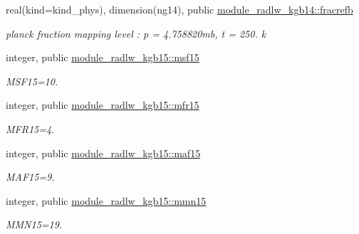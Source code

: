 \begin{DoxyCompactItemize}
real(kind=kind\+\_\+phys), dimension(ng14), public \hyperlink{group__module__radlw__kgbnn_ga13a211bf8a903d0720fa72ac90e4fc3f}{module\+\_\+radlw\+\_\+kgb14\+::fracrefb}
\begin{DoxyCompactList}\small\item\em planck fraction mapping level \+: p = 4.\+758820mb, t = 250. k \end{DoxyCompactList}\item 
\mbox{\label{group__module__radlw__kgbnn_gae1b588ee60974c2d451c89f842601e07}} 
integer, public \hyperlink{group__module__radlw__kgbnn_gae1b588ee60974c2d451c89f842601e07}{module\+\_\+radlw\+\_\+kgb15\+::msf15}
\begin{DoxyCompactList}\small\item\em M\+S\+F15=10. \end{DoxyCompactList}\item 
\mbox{\label{group__module__radlw__kgbnn_gad4d78009d0c7ffa27dbb228e68307675}} 
integer, public \hyperlink{group__module__radlw__kgbnn_gad4d78009d0c7ffa27dbb228e68307675}{module\+\_\+radlw\+\_\+kgb15\+::mfr15}
\begin{DoxyCompactList}\small\item\em M\+F\+R15=4. \end{DoxyCompactList}\item 
\mbox{\label{group__module__radlw__kgbnn_ga482858cf08fb1a14117dfbaa6a57fe8c}} 
integer, public \hyperlink{group__module__radlw__kgbnn_ga482858cf08fb1a14117dfbaa6a57fe8c}{module\+\_\+radlw\+\_\+kgb15\+::maf15}
\begin{DoxyCompactList}\small\item\em M\+A\+F15=9. \end{DoxyCompactList}\item 
\mbox{\label{group__module__radlw__kgbnn_ga8ab45999cfc7b9db0f3d3b61ccf803e8}} 
integer, public \hyperlink{group__module__radlw__kgbnn_ga8ab45999cfc7b9db0f3d3b61ccf803e8}{module\+\_\+radlw\+\_\+kgb15\+::mmn15}
\begin{DoxyCompactList}\small\item\em M\+M\+N15=19. \end{DoxyCompactList}\item 
\mbox{\label{group__module__radlw__kgbnn_gaa6412ac501e2afed3d1b64b0cdcdab9e}} 

\end{DoxyCompactItemize}
